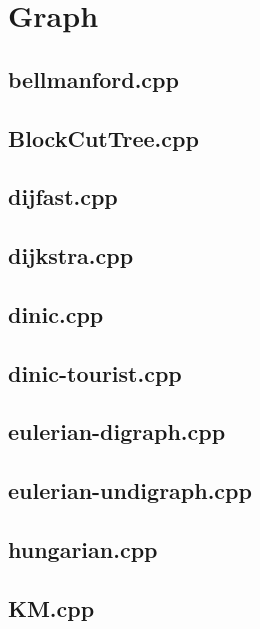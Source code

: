 \section{Graph}

\subsection{bellmanford.cpp}


\subsection{BlockCutTree.cpp}


\subsection{dijfast.cpp}


\subsection{dijkstra.cpp}


\subsection{dinic.cpp}


\subsection{dinic-tourist.cpp}


\subsection{eulerian-digraph.cpp}


\subsection{eulerian-undigraph.cpp}


\subsection{hungarian.cpp}


\subsection{KM.cpp}


